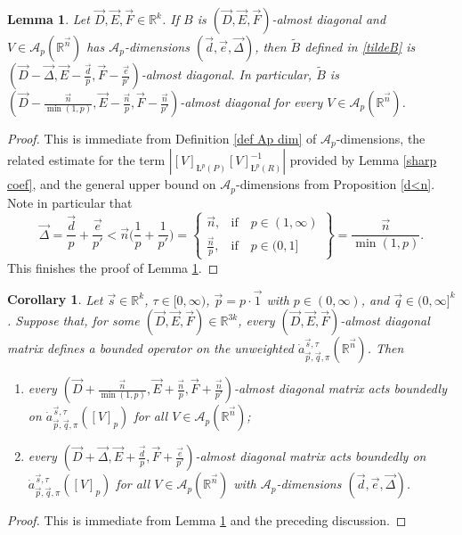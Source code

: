 \documentclass[11pt, reqno]{amsart}
\newtheorem{corollary}[theorem]{Corollary}
\newtheorem{lemma}[theorem]{Lemma}
\theoremstyle{definition}
\theoremstyle{remark}
\numberwithin{equation}{section}
\newcommand{\A}{\mathscr A}
\newcommand{\vD}{\vec D}
\newcommand{\vE}{\vec E}
\newcommand{\vF}{\vec F}
\newcommand{\R}{\mathbb R}
\newcommand{\vone}{\vec 1}
\newcommand{\vd}{\vec d}
\newcommand{\vDe}{\vec{\Delta}}
\newcommand{\ve}{\vec e}
\newcommand{\vn}{\vec n}
\newcommand{\vp}{\vec p}
\newcommand{\vq}{\vec q}
\newcommand{\vs}{\vec s}
\newcommand{\atau}{\dot a^{\vs,\tau}_{\vp,\vq,\pi}}
\newcommand{\aveL}{\textit{\L}}
\newcommand{\abs}[1]{|#1|}
\begin{document}
\begin{lemma}\label{lem AD simple}
Let $\vD,\vE,\vF\in \mathbb R^k$.
If $B$ is $(\vD,\vE,\vF)$-almost diagonal and $V\in\A_p(\R^{\vn})$ has $\A_p$-dimensions $(\vd,\ve,\vDe)$, then $\widetilde B$ defined in \eqref{tildeB} is
$(\vD-\vDe,\vE-\frac{\vd}{p},\vF-\frac{\ve}{p'})$-almost diagonal.
In particular, $\widetilde B$ is  $(\vD-\frac{\vn}{\min(1,p)},\vE-\frac{\vn}p,\vF-\frac{\vn}{p'})$-almost diagonal for every $V\in\A_p(\R^{\vn})$.
\end{lemma}

\begin{proof}
This is immediate from Definition \ref{def Ap dim} of $\A_p$-dimensions,
the related estimate for the term $\abs{[V]_{\aveL^p(P)} [V]_{\aveL^p(R)}^{-1}}$
provided by Lemma \ref{sharp coef}, and the general upper
bound on $\A_p$-dimensions from Proposition \ref{d<n}. Note in particular that
\begin{equation*}
\vDe=\frac{\vd}{p}+\frac{\ve}{p'}
<\vn \Big( \frac{1}{p}+\frac{1}{p'} \Big)
=\left.\begin{cases} \vn, & \text{if}\quad p\in(1,\infty) \\
{\displaystyle\frac {\vn}{p}}, & \text{if}\quad p\in(0,1]\end{cases}\right\}
=\frac{\vn}{\min(1,p)}.
\end{equation*}
This finishes the proof of Lemma \ref{lem AD simple}.
\end{proof}

\begin{corollary}\label{cor AD simple}
Let $\vs\in\R^k$, $\tau\in[0,\infty)$, $\vp=p\cdot\vone$ with $p\in(0,\infty)$, and $\vq\in(0,\infty]^k$.
Suppose that, for some $(\vD,\vE,\vF)\in\R^{3k}$, every $(\vD,\vE,\vF)$-almost diagonal matrix defines a bounded operator on the unweighted $\atau(\R^{\vn})$. Then
\begin{enumerate}[\rm(i)]
\item every $(\vD+\frac{\vn}{\min(1,p)},\vE+\frac{\vn}{p},\vF+\frac{\vn}{p'})$-almost diagonal matrix acts boundedly on $\atau([V]_p)$ for all $V\in\A_p(\R^{\vn})$;

\item every $(\vD+\vDe,\vE+\frac{\vd}{p},\vF+\frac{\ve}{p'})$-almost diagonal matrix acts boundedly on $\atau([V]_p)$ for all $V\in\A_p(\R^{\vn})$ with $\A_p$-dimensions $(\vd,\ve,\vDe)$.
\end{enumerate}
\end{corollary}

\begin{proof}
This is immediate from Lemma \ref{lem AD simple} and the preceding discussion.
\end{proof}
\end{document}
